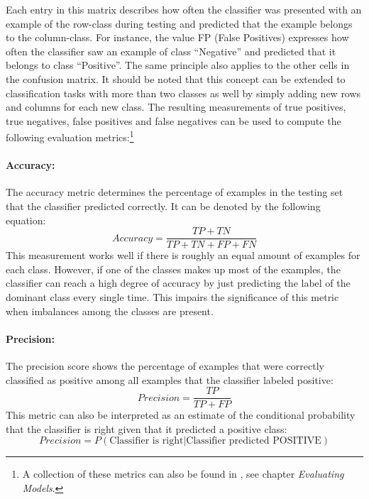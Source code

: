 Each entry in this matrix describes how often the
classifier was presented with an example of the row-class during testing and
predicted that the example belongs to the column-class. For instance, the value FP
(False Positives) expresses how often the classifier saw an example of
class ``Negative'' and predicted that it belongs to class
``Positive''. The same principle also applies to the other cells in the
confusion matrix. It should be noted that this concept can be extended to
classification tasks with more than two classes as well by simply
adding new rows and columns for each new class. The resulting
measurements of true positives, true negatives, false positives and
false negatives can be used to compute the following evaluation
metrics:\footnote{A collection of these metrics can also be found in
  \cite{Patterson}, see chapter \textit{Evaluating Models}.}

\paragraph{Accuracy:} The accuracy metric determines the percentage of
examples in the testing set that the classifier predicted correctly.
It can be denoted by the following equation:
\begin{equation}
  Accuracy = \frac{TP + TN}{TP + TN + FP + FN}
\end{equation}
This measurement works well if there is roughly an equal amount of examples
for each class. However, if one of the classes makes up most of the
examples, the classifier can reach a high degree of accuracy by just
predicting the label of the dominant class every single time. This
impairs the significance of this metric when imbalances among the
classes are present.

\paragraph{Precision:} The precision score shows the percentage of
examples that were correctly classified as positive among all examples
that the classifier labeled positive:
\begin{equation}
  Precision = \frac{TP}{TP + FP}
\end{equation}
This metric can also be interpreted as an estimate of the conditional probability
that the classifier is right given that it predicted a positive class:
\begin{equation*}
  Precision = P(\text{Classifier is right} \vert \text{Classifier predicted
    POSITIVE})
\end{equation*}

